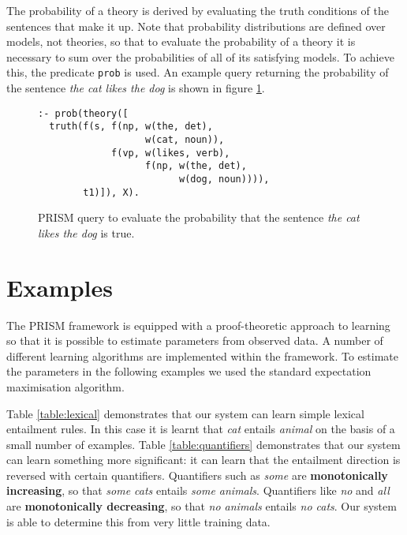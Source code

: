 \documentclass[letterpaper]{article}
\begin{document}
The probability of a theory is derived by evaluating the truth conditions of the sentences that make it up. Note that probability distributions are defined over models, not theories, so that  to evaluate the
probability of a theory it is necessary to sum over the probabilities of all of its satisfying models. To achieve this,  the predicate \texttt{prob} is used. An
example query returning the probability of the sentence {\em the cat likes the dog\/} is shown in figure \ref{figure:query}. 




\begin{figure}
\begin{lstlisting}
:- prob(theory([
  truth(f(s, f(np, w(the, det),
                   w(cat, noun)),
             f(vp, w(likes, verb),
                   f(np, w(the, det),
                         w(dog, noun)))),
        t1)]), X).
\end{lstlisting}
\caption{PRISM query to evaluate the probability that the sentence
  \emph{the cat likes the dog} is true.}
\label{figure:query}
\end{figure}

\section{Examples}


The PRISM framework is equipped with a proof-theoretic approach to learning so that it is possible to estimate parameters from observed data. A number of different learning algorithms are implemented within the framework. To estimate the
parameters in the following examples we used the standard expectation maximisation algorithm.

Table \ref{table:lexical} demonstrates that our system can learn
simple lexical entailment rules. In this case it is learnt that \emph{cat} entails
\emph{animal} on the basis of a small number of examples. Table \ref{table:quantifiers} demonstrates that our system can learn
something more significant: it can learn that the entailment direction
is reversed with certain quantifiers. Quantifiers such as \emph{some} are
\textbf{monotonically increasing}, so that \emph{some cats} entails
\emph{some animals}. Quantifiers like \emph{no} and \emph{all} are
\textbf{monotonically decreasing}, so that \emph{no animals} entails
\emph{no cats}. Our system is able to determine this from very little
training data.
\end{document}
